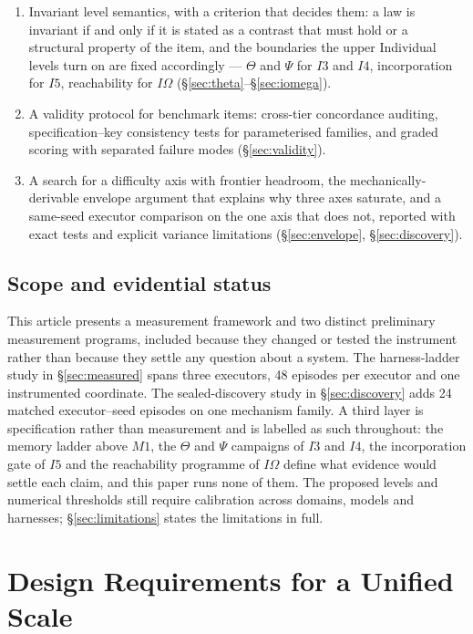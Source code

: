 \documentclass[11pt]{article}
\theoremstyle{definition}
\newcommand{\Om}{\ensuremath{\Omega}}
\begin{document}
\begin{enumerate}
\item Invariant level semantics, with a criterion that decides them: a law is invariant if and only if it is stated as a contrast that must hold or a structural property of the item, and the boundaries the upper Individual levels turn on are fixed accordingly --- $\Theta$ and $\Psi$ for $I3$ and $I4$, incorporation for $I5$, reachability for $I\Om{}$ (\S\ref{sec:theta}--\S\ref{sec:iomega}).
\item A validity protocol for benchmark items: cross-tier concordance auditing, specification--key consistency tests for parameterised families, and graded scoring with separated failure modes (\S\ref{sec:validity}).
\item A search for a difficulty axis with frontier headroom, the mechanically-derivable envelope argument that explains why three axes saturate, and a same-seed executor comparison on the one axis that does not, reported with exact tests and explicit variance limitations (\S\ref{sec:envelope}, \S\ref{sec:discovery}).
\end{enumerate}
\endgroup

\subsection{Scope and evidential status}

This article presents a measurement framework and two distinct preliminary measurement programs, included because they changed or tested the instrument rather than because they settle any question about a system. The harness-ladder study in \S\ref{sec:measured} spans three executors, 48 episodes per executor and one instrumented coordinate. The sealed-discovery study in \S\ref{sec:discovery} adds 24 matched executor--seed episodes on one mechanism family. A third layer is specification rather than measurement and is labelled as such throughout: the memory ladder above $M1$, the $\Theta$ and $\Psi$ campaigns of $I3$ and $I4$, the incorporation gate of $I5$ and the reachability programme of $I\Om{}$ define what evidence would settle each claim, and this paper runs none of them. The proposed levels and numerical thresholds still require calibration across domains, models and harnesses; \S\ref{sec:limitations} states the limitations in full.

\section{Design Requirements for a Unified Scale}
\end{document}
